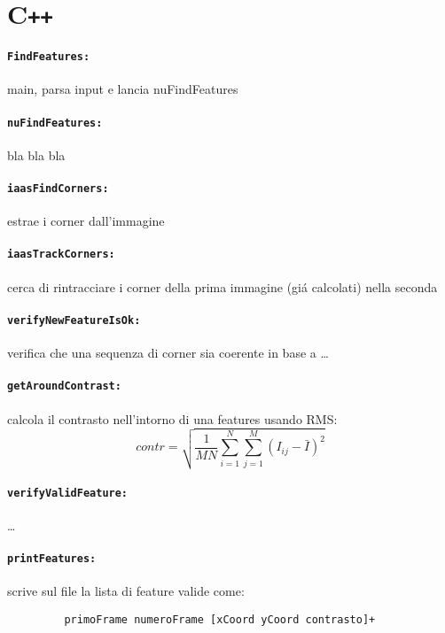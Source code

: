 \documentclass[12pt]{report}
\begin{document}
\section[C++]{C\verb_++_}

\paragraph*{\verb_FindFeatures:_} main, parsa input e lancia nuFindFeatures

\paragraph*{\verb_nuFindFeatures:_} bla bla bla

\paragraph*{\verb_iaasFindCorners:_} estrae i corner dall'immagine

\paragraph*{\verb_iaasTrackCorners:_} cerca di rintracciare i corner della prima immagine (gi\'a calcolati) nella seconda

\paragraph*{\verb_verifyNewFeatureIsOk:_} verifica che una sequenza di corner sia coerente in base a \dots

\paragraph*{\verb_getAroundContrast:_} calcola il contrasto nell'intorno di una features usando RMS: $$contr = \sqrt{\frac{1}{MN}\sum_{i=1}^N\sum_{j=1}^M(I_{ij}-\bar{I})^2}$$

\paragraph*{\verb_verifyValidFeature:_} \dots


\paragraph*{\verb_printFeatures:_} scrive sul file la lista di feature valide come:
\begin{verbatim}
	     primoFrame numeroFrame [xCoord yCoord contrasto]+
\end{verbatim}
\end{document}
